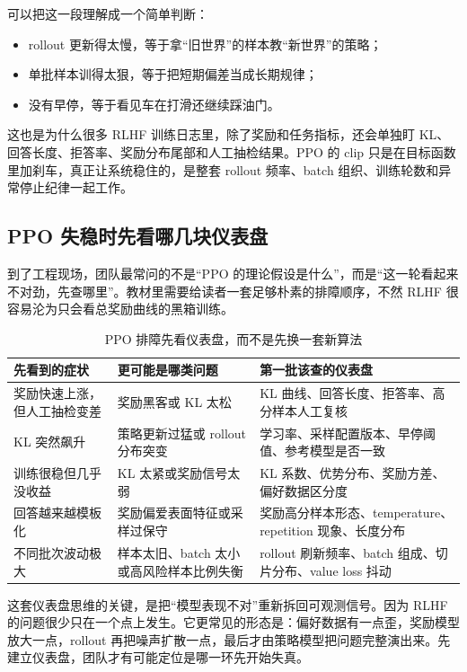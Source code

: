 可以把这一段理解成一个简单判断：
\begin{itemize}
  \item rollout 更新得太慢，等于拿“旧世界”的样本教“新世界”的策略；
  \item 单批样本训得太狠，等于把短期偏差当成长期规律；
  \item 没有早停，等于看见车在打滑还继续踩油门。
\end{itemize}

这也是为什么很多 RLHF 训练日志里，除了奖励和任务指标，还会单独盯 KL、回答长度、拒答率、奖励分布尾部和人工抽检结果。PPO 的 clip 只是在目标函数里加刹车，真正让系统稳住的，是整套 rollout 频率、batch 组织、训练轮数和异常停止纪律一起工作。

\subsection{PPO 失稳时先看哪几块仪表盘}
到了工程现场，团队最常问的不是“PPO 的理论假设是什么”，而是“这一轮看起来不对劲，先查哪里”。教材里需要给读者一套足够朴素的排障顺序，不然 RLHF 很容易沦为只会看总奖励曲线的黑箱训练。

\begin{table}[H]
\centering
\small
\begin{tabularx}{\textwidth}{>{\raggedright\arraybackslash}p{2.9cm}>{\raggedright\arraybackslash}p{3cm}>{\raggedright\arraybackslash}X}
\toprule
\textbf{先看到的症状} & \textbf{更可能是哪类问题} & \textbf{第一批该查的仪表盘} \\
\midrule
奖励快速上涨，但人工抽检变差 & 奖励黑客或 KL 太松 & KL 曲线、回答长度、拒答率、高分样本人工复核 \\
KL 突然飙升 & 策略更新过猛或 rollout 分布突变 & 学习率、采样配置版本、早停阈值、参考模型是否一致 \\
训练很稳但几乎没收益 & KL 太紧或奖励信号太弱 & KL 系数、优势分布、奖励方差、偏好数据区分度 \\
回答越来越模板化 & 奖励偏爱表面特征或采样过保守 & 奖励高分样本形态、temperature、repetition 现象、长度分布 \\
不同批次波动极大 & 样本太旧、batch 太小或高风险样本比例失衡 & rollout 刷新频率、batch 组成、切片分布、value loss 抖动 \\
\bottomrule
\end{tabularx}
\caption{PPO 排障先看仪表盘，而不是先换一套新算法}
\label{tab:ppo-debug-dashboard}
\end{table}

这套仪表盘思维的关键，是把“模型表现不对”重新拆回可观测信号。因为 RLHF 的问题很少只在一个点上发生。它更常见的形态是：偏好数据有一点歪，奖励模型放大一点，rollout 再把噪声扩散一点，最后才由策略模型把问题完整演出来。先建立仪表盘，团队才有可能定位是哪一环先开始失真。

